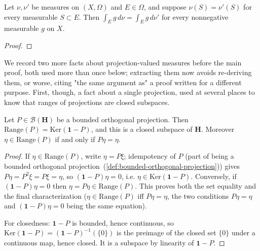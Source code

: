 \begin{proposition}
    \label{prpstn:integrals-agree-when-measures-agree}
    \leanok
    Let $\nu, \nu'$ be measures on $(X,\Omega)$ and $E \in \Omega$, and suppose $\nu(S) = \nu'(S)$ for every measurable $S \subset E$. Then $\int_E g \, d\nu = \int_E g \, d\nu'$ for every nonnegative measurable $g$ on $X$.
\end{proposition}
\begin{proof}
\leanok
\end{proof}

We record two more facts about projection-valued measures before the main proof, both used more than once below; extracting them now avoids re-deriving them, or worse, citing "the same argument as" a proof written for a different purpose. First, though, a fact about a single projection, used at several places to know that ranges of projections are closed subspaces.

\begin{lemma}
    \label{lmm:range-of-projection-is-kernel}
    \leanok
    Let $P \in \mathcal{B}(\mathbf{H})$ be a bounded orthogonal projection. Then $\text{Range}(P) = \text{Ker}(\mathbf{1} - P)$, and this is a closed subspace of $\mathbf{H}$. Moreover $\eta \in \text{Range}(P)$ if and only if $P\eta = \eta$.
\end{lemma}
\begin{proof}
    \leanok
If $\eta \in \text{Range}(P)$, write $\eta = P\xi$; idempotency of $P$ (part of being a bounded orthogonal projection~(\ref{def:bounded-orthogonal-projection})) gives $P\eta = P^2\xi = P\xi = \eta$, so $(\mathbf{1}-P)\eta = 0$, i.e. $\eta \in \text{Ker}(\mathbf{1}-P)$. Conversely, if $(\mathbf{1}-P)\eta = 0$ then $\eta = P\eta \in \text{Range}(P)$. This proves both the set equality and the final characterization ($\eta \in \text{Range}(P)$ iff $P\eta = \eta$, the two conditions $P\eta=\eta$ and $(\mathbf{1}-P)\eta=0$ being the same equation).

For closedness: $\mathbf{1} - P$ is bounded, hence continuous, so $\text{Ker}(\mathbf{1}-P) = (\mathbf{1}-P)^{-1}(\{0\})$ is the preimage of the closed set $\{0\}$ under a continuous map, hence closed. It is a subspace by linearity of $\mathbf{1}-P$.
\end{proof}

